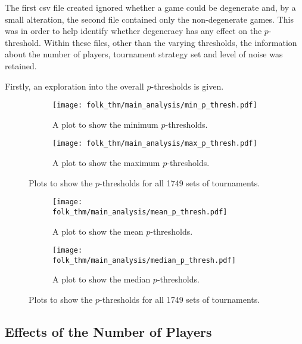The first csv file created ignored whether a game could be degenerate and, by a
small alteration, the second file contained only the non-degenerate games. This
was in order to help identify whether degeneracy has any effect on the
\(p\)-threshold. Within these files, other than the varying thresholds, the
information about the number of players, tournament strategy set and level of
noise was retained.

Firstly, an exploration into the overall \(p\)-thresholds is given.

\begin{figure}
    \centering
    \begin{subfigure}[0.45\textwidth]
        \centering
        \texttt{[image: folk\_thm/main\_analysis/min\_p\_thresh.pdf]}
        \caption{A plot to show the minimum \(p\)-thresholds.}
    \end{subfigure}\label{subfig:min_p_thresh}

    \begin{subfigure}[0.45\textwidth]
        \centering
        \texttt{[image: folk\_thm/main\_analysis/max\_p\_thresh.pdf]}
        \caption{A plot to show the maximum \(p\)-thresholds.}
    \end{subfigure}\label{subfig:max_p_thresh}
    \caption{Plots to show the \(p\)-thresholds for all 1749 sets of tournaments.}\label{fig:min_max_p_thresh}
\end{figure}


\begin{figure}
    \centering
    \begin{subfigure}[0.45\textwidth]
        \centering
        \texttt{[image: folk\_thm/main\_analysis/mean\_p\_thresh.pdf]}
        \caption{A plot to show the mean \(p\)-thresholds.}
    \end{subfigure}\label{subfig:mean_p_thresh}

    \begin{subfigure}[0.45\textwidth]
        \centering
        \texttt{[image: folk\_thm/main\_analysis/median\_p\_thresh.pdf]}
        \caption{A plot to show the median \(p\)-thresholds.}
    \end{subfigure}\label{subfig:median_p_thresh}
    \caption{Plots to show the \(p\)-thresholds for all 1749 sets of tournaments.}\label{fig:mean_maedian_p_thresh}
\end{figure}

\subsection{Effects of the Number of Players}\label{subsec:Effects_of_the_number_of_Players}

